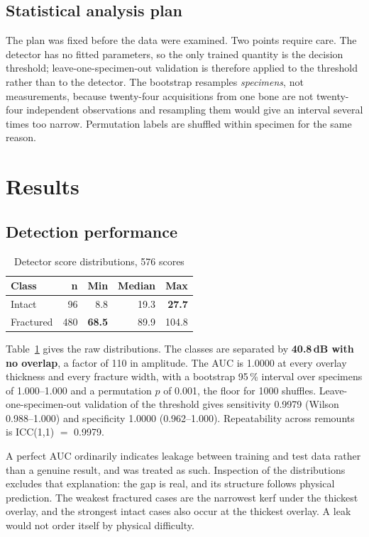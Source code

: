 \documentclass[conference]{IEEEtran}
\begin{document}
\subsection{Statistical analysis plan}
The plan was fixed before the data were examined. Two points require care.
The detector has no fitted parameters, so the only trained quantity is the
decision threshold; leave-one-specimen-out validation is therefore applied
to the threshold rather than to the detector. The bootstrap resamples
\emph{specimens}, not measurements, because twenty-four acquisitions from
one bone are not twenty-four independent observations and resampling them
would give an interval several times too narrow. Permutation labels are
shuffled within specimen for the same reason.

\section{Results}

\subsection{Detection performance}

\begin{table}[t]
\caption{Detector score distributions, 576 scores}
\label{tab:dist}
\centering
\footnotesize
\begin{tabular}{@{}lrrrr@{}}
\toprule
\textbf{Class} & \textbf{n} & \textbf{Min} & \textbf{Median} & \textbf{Max} \\
\midrule
Intact & 96 & 8.8 & 19.3 & \textbf{27.7} \\
Fractured & 480 & \textbf{68.5} & 89.9 & 104.8 \\
\bottomrule
\end{tabular}
\end{table}

Table~\ref{tab:dist} gives the raw distributions. The classes are separated
by \textbf{40.8\,dB with no overlap}, a factor of 110 in amplitude. The AUC
is 1.0000 at every overlay thickness and every fracture width, with a
bootstrap 95\,\% interval over specimens of 1.000--1.000 and a permutation
$p$ of 0.001, the floor for 1000 shuffles. Leave-one-specimen-out validation
of the threshold gives sensitivity 0.9979 (Wilson 0.988--1.000) and
specificity 1.0000 (0.962--1.000). Repeatability across remounts is
ICC(1,1) $=$ 0.9979.

A perfect AUC ordinarily indicates leakage between training and test data
rather than a genuine result, and was treated as such. Inspection of the
distributions excludes that explanation: the gap is real, and its structure
follows physical prediction. The weakest fractured cases are the narrowest
kerf under the thickest overlay, and the strongest intact cases also occur
at the thickest overlay. A leak would not order itself by physical
difficulty.
\end{document}

